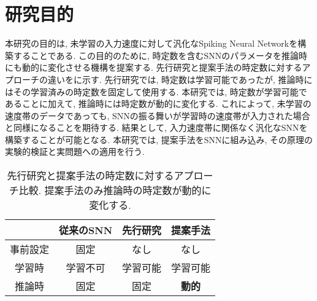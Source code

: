 \section{研究目的}
本研究の目的は, 未学習の入力速度に対して汎化なSpiking Neural Networkを構築することである.
この目的のために, 時定数を含むSNNのパラメータを推論時にも動的に変化させる機構を提案する.
先行研究と提案手法の時定数に対するアプローチの違いをに示す.
先行研究では, 時定数は学習可能であったが, 推論時にはその学習済みの時定数を固定して使用する.
本研究では, 時定数が学習可能であることに加えて, 推論時には時定数が動的に変化する.
これによって, 未学習の速度帯のデータであっても, SNNの振る舞いが学習時の速度帯が入力された場合と同様になることを期待する.
結果として, 入力速度帯に関係なく汎化なSNNを構築することが可能となる.
本研究では, 提案手法をSNNに組み込み, その原理の実験的検証と実問題への適用を行う.
\begin{table}[htb]
    \centering
    \caption[先行研究と提案手法の時定数に対するアプローチ比較]{
        先行研究と提案手法の時定数に対するアプローチ比較. 提案手法のみ推論時の時定数が動的に変化する.
    }
    \label{tab:method:comparison}
    \begin{tabular}{cccc}
        \hline
         & \textbf{従来のSNN} & \textbf{先行研究}\cite{dhsnn,paramsnn} & \textbf{提案手法}\\
        \hline
        事前設定 & 固定 & なし & なし\\
        学習時 & 学習不可 & 学習可能 & 学習可能\\
        推論時 & 固定 & 固定 & \textbf{動的}\\
        \hline
    \end{tabular}
\end{table}
